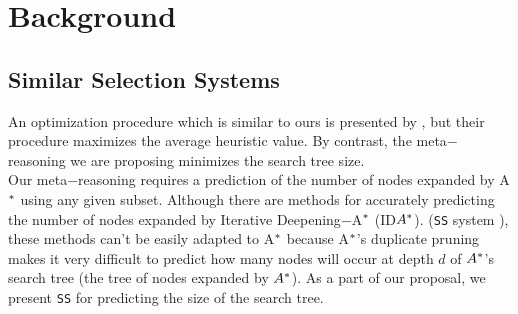 
 
\chapter{Background}\label{background}

\section{Similar Selection Systems}

\noindent
An optimization procedure which is similar to ours is presented by \cite{raynersss13}, but their procedure maximizes the average heuristic value. By contrast, the meta$-$reasoning we are proposing minimizes the search tree size.\\

Our meta$-$reasoning requires a prediction of the number of nodes expanded by A$\sp{*}$ using any given subset. Although there are methods for accurately predicting the number of nodes expanded by Iterative Deepening$-$A$\sp{*}$ \cite{Korf85ida} (ID$A\sp{*}$). (\texttt{SS} system  \cite{lelis2013predicting}), these methods can't be easily adapted to A$\sp{*}$ because A$\sp{*}$'s duplicate pruning makes it very difficult to predict how many nodes will occur at depth $d$ of $A\sp{*}$'s search tree (the tree of nodes expanded by $A\sp{*}$). As a part of our proposal, we present \texttt{SS} for predicting the size of the search tree.

